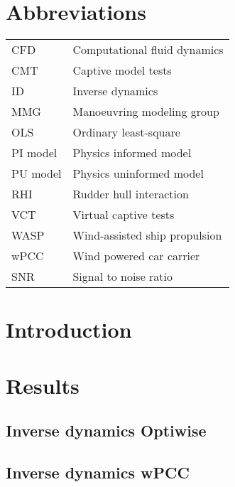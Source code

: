 \documentclass[preprint,12pt,authoryear]{elsarticle}
\begin{document}
\section*{Abbreviations}
\label{sec:introduction}
\begin{table}[h]
    \centering
    \scriptsize
    \label{tab:abbreviations}
    \begin{tabular}{l l}

    CFD & Computational fluid dynamics \\
    CMT & Captive model tests \\
    ID & Inverse dynamics \\
    MMG & Manoeuvring modeling group \\
    OLS & Ordinary least-square \\
    PI model & Physics informed  model \\
    PU model & Physics uninformed  model \\
    RHI & Rudder hull interaction \\
    VCT & Virtual captive tests \\
    WASP & Wind-assisted ship propulsion \\
    wPCC & Wind powered car carrier \\
    SNR & Signal to noise ratio \\
    \end{tabular}
        
\end{table}
\FloatBarrier

\section{Introduction}
\label{sec:introduction}

\section{Results}
\label{sec:results}
%
\FloatBarrier

\subsection{Inverse dynamics Optiwise}

\FloatBarrier

\subsection{Inverse dynamics wPCC}

\FloatBarrier
\end{document}

